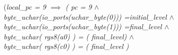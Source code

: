 {\begin{sloppypar}
\hspace*{0.80in}\rm (\it local\_pc \rm = \rm 9\hspace*{0.10in} $\implies$  \rm ( \it pc \rm = \rm 9 
$\land$\\
\hspace*{1.10in}\it byte\_uchar\rm (\it io\_ports\rm (\it uchar\_byte\rm (\rm 0\rm )\rm )\rm ) \rm
=\hspace*{0.10in}\it initial\_level  $\land$ \hspace*{0.20in}\\
\hspace*{1.10in}\it byte\_uchar\rm (\it io\_ports\rm (\it uchar\_byte\rm (\rm 1\rm )\rm )\rm ) \rm
=\hspace*{0.10in}\it final\_level  $\land$\\
\hspace*{1.10in}\it byte\_uchar\rm ( \it rgs8\rm (\it a0\rm ) \rm ) \rm = \rm ( \it final\_level\rm ) 
$\land$\\
\hspace*{1.10in}\it byte\_uchar\rm ( \it rgs8\rm (\it c0\rm ) \rm ) \rm = \rm ( \it final\_level \rm ) 

\end{sloppypar}}
